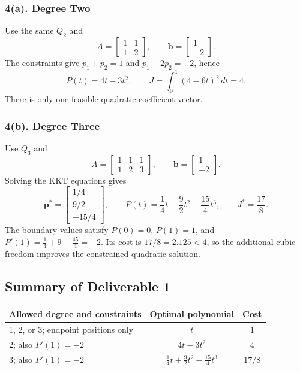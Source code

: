 \subsubsection*{4(a). Degree Two}
Use the same $Q_2$ and
\begin{equation}
A=\begin{bmatrix}1&1\\1&2\end{bmatrix},\qquad
\mathbf b=\begin{bmatrix}1\\-2\end{bmatrix}.
\end{equation}
The constraints give $p_1+p_2=1$ and $p_1+2p_2=-2$, hence
\begin{equation}
\boxed{P(t)=4t-3t^2,\qquad J=\int_0^1(4-6t)^2\,dt=4.}
\end{equation}
There is only one feasible quadratic coefficient vector.

\subsubsection*{4(b). Degree Three}
Use $Q_3$ and
\begin{equation}
A=\begin{bmatrix}1&1&1\\1&2&3\end{bmatrix},\qquad
\mathbf b=\begin{bmatrix}1\\-2\end{bmatrix}.
\end{equation}
Solving the KKT equations gives
\begin{equation}
\mathbf p^*=\begin{bmatrix}1/4\\9/2\\-15/4\end{bmatrix},\qquad
\boxed{P(t)=\frac14t+\frac92t^2-\frac{15}{4}t^3,\qquad J^*=\frac{17}{8}.}
\end{equation}
The boundary values satisfy $P(0)=0$, $P(1)=1$, and
$P'(1)=\frac14+9-\frac{45}{4}=-2$. Its cost is $17/8=2.125<4$, so the
additional cubic freedom improves the constrained quadratic solution.

\subsection*{Summary of Deliverable 1}
\begin{center}\small
\begin{tabular}{@{}lcc@{}}
\toprule
Allowed degree and constraints & Optimal polynomial & Cost \\
\midrule
1, 2, or 3; endpoint positions only & $t$ & $1$ \\
2; also $P'(1)=-2$ & $4t-3t^2$ & $4$ \\
3; also $P'(1)=-2$ & $\frac14t+\frac92t^2-\frac{15}{4}t^3$ & $17/8$ \\
\bottomrule
\end{tabular}
\end{center}

